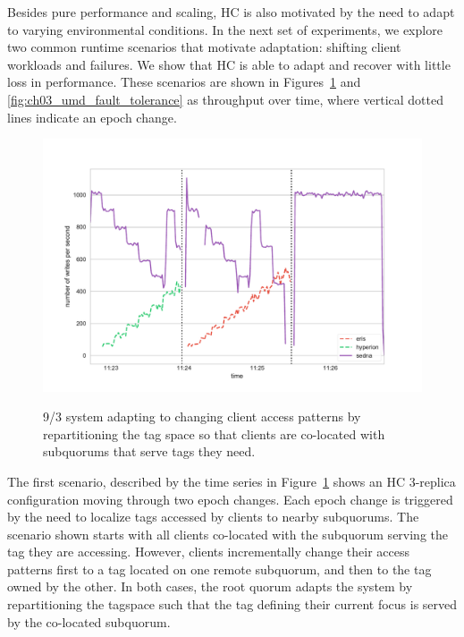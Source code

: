 Besides pure performance and scaling, HC is also motivated by the need to adapt to varying environmental conditions.
In the next set of experiments, we explore two common runtime scenarios that motivate adaptation: shifting client workloads and failures.
We show that HC is able to adapt and recover with little loss in performance. These scenarios are shown in Figures~\ref{fig:ch03_umd_sawtooth} and \ref{fig:ch03_umd_fault_tolerance} as throughput over time, where vertical dotted lines indicate an epoch change.

\begin{figure}
    \begin{center}
        \includegraphics[width=5in]{figures/ch03_umd_sawtooth.pdf}
    \end{center}
    \renewcommand{\baselinestretch}{1}
    \small\normalsize

    \begin{quote}
        \caption[Sawtooth Graph]{9/3 system adapting to changing client access patterns by repartitioning the tag space so that clients are co-located with subquorums that serve tags they need.}
        \label{fig:ch03_umd_sawtooth}
    \end{quote}
\end{figure}
\renewcommand{\baselinestretch}{2}
\small\normalsize

The first scenario, described by the time series in Figure~\ref{fig:ch03_umd_sawtooth} shows an HC 3-replica configuration moving through two epoch changes.
Each epoch change is triggered by the need to localize tags accessed by
clients to nearby subquorums.
The scenario shown starts with all clients co-located with the subquorum serving the tag they are accessing.
However, clients incrementally change their access patterns first to a tag located on one remote subquorum, and then to the tag owned by the other.
In both cases, the root quorum adapts the system by repartitioning the tagspace such that the tag defining their current focus is served by the co-located subquorum.

